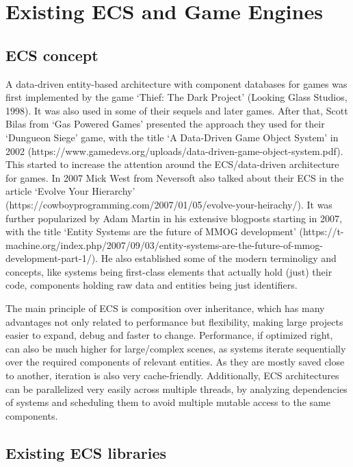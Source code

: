 \chapter{Existing ECS and Game Engines}\label{chap:engines}

\section{ECS concept}

A data-driven entity-based architecture with component databases for games was first implemented by the game `Thief: The Dark Project' (Looking Glass Studios, 1998). It was also used in some of their sequels and later games. After that, Scott Bilas from `Gas Powered Games' presented the approach they used for their `Dungueon Siege' game, with the title `A Data-Driven Game Object System' in 2002 (https://www.gamedevs.org/uploads/data-driven-game-object-system.pdf). This started to increase the attention around the ECS/data-driven architecture for games. In 2007 Mick West from Neversoft also talked about their ECS in the article `Evolve Your Hierarchy' (https://cowboyprogramming.com/2007/01/05/evolve-your-heirachy/). It was further popularized by Adam Martin in his extensive blogposts starting in 2007, with the title `Entity Systems are the future of MMOG development' (https://t-machine.org/index.php/2007/09/03/entity-systems-are-the-future-of-mmog-development-part-1/). He also established some of the modern terminoligy and concepts, like systems being first-class elements that actually hold (just) their code, components holding raw data and entities being just identifiers.

The main principle of ECS is composition over inheritance, which has many advantages not only related to performance but flexibility, making large projects easier to expand, debug and faster to change. Performance, if optimized right, can also be much higher for large/complex scenes, as systems iterate sequentially over the required components of relevant entities. As they are mostly saved close to another, iteration is also very cache-friendly. Additionally, ECS architectures can be parallelized very easily across multiple threads, by analyzing dependencies of systems and scheduling them to avoid multiple mutable access to the same components.

\section{Existing ECS libraries}

